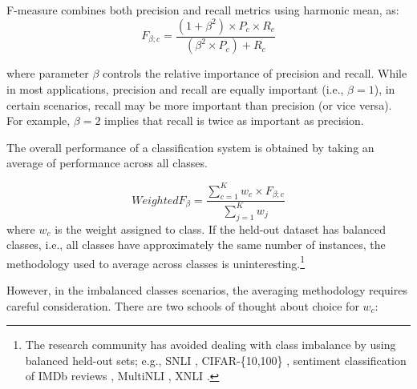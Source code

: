 F-measure combines both precision and recall metrics using harmonic mean, as:
$$F_{\beta;c} = \frac{(1+\beta^2) \times P_c \times R_c}{(\beta^2 \times P_c) + R_c}$$

where parameter $\beta$ controls the relative importance of precision and recall.
While in most applications, precision and recall are equally important (i.e., $\beta=1$), in certain scenarios, recall may be more important than precision (or vice versa). For example, $\beta=2$ implies that recall is twice as important as precision.

The overall performance of a classification system is obtained by taking an average of performance across all classes.

$$WeightedF_\beta = \frac{\sum_{c=1}^K w_c \times F_{\beta;c}}{ \sum_{j=1}^K w_j}$$
where $w_c$ is the weight assigned to class. 
If the held-out dataset has balanced classes, i.e., all classes have approximately the same number of instances, the methodology used to average across classes is uninteresting.\footnote{The research community has avoided dealing with class imbalance by using balanced held-out sets; e.g., SNLI \cite{maccartney-manning-2008-snli}, CIFAR-\{10,100\} \cite{Krizhevsky-2009-CIFAR}, sentiment classification of IMDb reviews \cite{maas-etal-2011-imdbreview}, MultiNLI \cite{williams-etal-2018-multinli}, XNLI \cite{conneau-etal-2018-xnli}.} 

However, in the imbalanced classes scenarios, the averaging methodology requires careful consideration. There are two schools of thought about choice for $w_c$:

